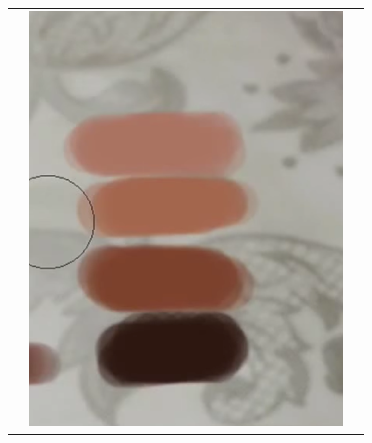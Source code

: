 \begin{longtable}{|c|c|c|}
\begin{minipage}{.29\textwidth}
  \end{minipage} & 
  \begin{minipage}{.29\textwidth}
    \includegraphics[width=\textwidth,height=\textheight,keepaspectratio]{images/match_body_targ}
  \end{minipage} & 
  \begin{minipage}{.29\textwidth}

\end{minipage}
\end{longtable}
